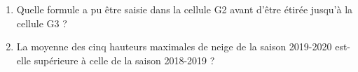 \documentclass[exercice,a4]{thedocument}%
\begin{document}
\begin{enumerate}
	\begin{enumerate}
		\item Quelle formule a pu être saisie dans la cellule G2 avant d’être étirée jusqu’à la cellule G3 ?
		\item La moyenne des cinq hauteurs maximales de neige de la saison 2019-2020 est-elle supérieure à celle de la saison 2018-2019 ?
	\end{enumerate}
\end{enumerate}

\bigskip

\showthesource
\end{document}
